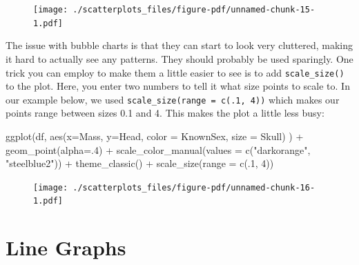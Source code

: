 \documentclass[
  letterpaper,
  DIV=11,
  numbers=noendperiod]{scrreprt}
\newenvironment{Shaded}{\begin{snugshade}}{\end{snugshade}}
\newcommand{\AttributeTok}[1]{\textcolor[rgb]{0.40,0.45,0.13}{#1}}
\newcommand{\DecValTok}[1]{\textcolor[rgb]{0.68,0.00,0.00}{#1}}
\newcommand{\FunctionTok}[1]{\textcolor[rgb]{0.28,0.35,0.67}{#1}}
\newcommand{\NormalTok}[1]{\textcolor[rgb]{0.00,0.23,0.31}{#1}}
\newcommand{\SpecialCharTok}[1]{\textcolor[rgb]{0.37,0.37,0.37}{#1}}
\newcommand{\StringTok}[1]{\textcolor[rgb]{0.13,0.47,0.30}{#1}}
\begin{document}
\begin{figure}[H]

{\centering \texttt{[image: ./scatterplots\_files/figure-pdf/unnamed-chunk-15-1.pdf]}

}

\end{figure}

The issue with bubble charts is that they can start to look very
cluttered, making it hard to actually see any patterns. They should
probably be used sparingly. One trick you can employ to make them a
little easier to see is to add \texttt{scale\_size()} to the plot. Here,
you enter two numbers to tell it what size points to scale to. In our
example below, we used \texttt{scale\_size(range\ =\ c(.1,\ 4))} which
makes our points range between sizes 0.1 and 4. This makes the plot a
little less busy:

\begin{Shaded}
\begin{Highlighting}[]
\FunctionTok{ggplot}\NormalTok{(df, }\FunctionTok{aes}\NormalTok{(}\AttributeTok{x=}\NormalTok{Mass, }\AttributeTok{y=}\NormalTok{Head, }\AttributeTok{color =}\NormalTok{ KnownSex, }\AttributeTok{size =}\NormalTok{ Skull) ) }\SpecialCharTok{+} 
  \FunctionTok{geom\_point}\NormalTok{(}\AttributeTok{alpha=}\NormalTok{.}\DecValTok{4}\NormalTok{) }\SpecialCharTok{+}
  \FunctionTok{scale\_color\_manual}\NormalTok{(}\AttributeTok{values =} \FunctionTok{c}\NormalTok{(}\StringTok{"darkorange"}\NormalTok{, }\StringTok{"steelblue2"}\NormalTok{)) }\SpecialCharTok{+}
  \FunctionTok{theme\_classic}\NormalTok{() }\SpecialCharTok{+}
  \FunctionTok{scale\_size}\NormalTok{(}\AttributeTok{range =} \FunctionTok{c}\NormalTok{(.}\DecValTok{1}\NormalTok{, }\DecValTok{4}\NormalTok{))}
\end{Highlighting}
\end{Shaded}

\begin{figure}[H]

{\centering \texttt{[image: ./scatterplots\_files/figure-pdf/unnamed-chunk-16-1.pdf]}

}

\end{figure}


\hypertarget{line-graphs}{%
\chapter{Line Graphs}\label{line-graphs}}
\end{document}
